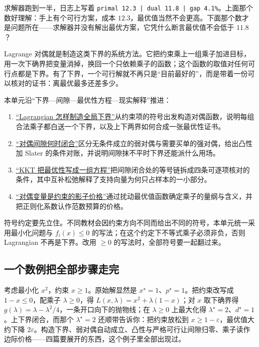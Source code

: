 求解器跑到一半，日志上写着 \texttt{primal 12.3 | dual 11.8 | gap 4.1\%}。上面那个数好理解：手上有个可行方案，成本 \(12.3\)，最优值当然不会更高。下面那个数才是问题所在——求解器并没有解出最优方案，它凭什么断言最优值不会低于 \(11.8\)？

Lagrange 对偶就是制造这类下界的系统方法。它把约束乘上一组乘子加进目标，用一次下确界把变量消掉，换回一个只依赖乘子的函数；这个函数的取值对任何可行点都是下界。有了下界，一个可行解就不再只是``目前最好的''，而是带着一份可以核对的证书：离最优最多还差多少。

本单元沿``下界---间隙---最优性方程---现实解释''推进：

\begin{enumerate}
\tightlist
\item
  \hyperref[sec:09-Convex-Optimization/05-Duality/01]{``Lagrangian 怎样制造全局下界''}从约束项的符号出发构造对偶函数，说明每组合法乘子都白送一个下界，以及上下两界如何合成一张最优性证书。
\item
  \hyperref[sec:09-Convex-Optimization/05-Duality/02]{``对偶间隙何时闭合''}区分无条件成立的弱对偶与需要买单的强对偶，给出凸性加 Slater 的条件对账，并说明间隙抹不平时下界还能派什么用场。
\item
  \hyperref[sec:09-Convex-Optimization/05-Duality/03]{``KKT 把最优性写成一组方程''}把间隙闭合处的等号链拆成四条可逐项核对的条件，其中互补松弛解释了支持向量为何只占样本的一小部分。
\item
  \hyperref[sec:09-Convex-Optimization/05-Duality/04]{``对偶变量是约束的影子价格''}通过扰动最优值函数确定乘子的量纲与含义，并把正则化系数认作范数预算的价格。
\end{enumerate}

符号约定要先立住。不同教材会因约束方向不同而给出不同的符号，本单元统一采用最小化问题与 \(f_i(x)\le0\) 的写法；在这个约定下不等式乘子必须非负，否则 Lagrangian 不再是下界。改用 \(\ge0\) 的写法时，全部符号要一起翻过来。

\subsection{一个数例把全部步骤走完}

考虑最小化 \(x^2\)，约束 \(x\ge1\)。原始解显然是 \(x^\star=1\)、\(p^\star=1\)。把约束改写成 \(1-x\le0\)，配乘子 \(\lambda\ge0\)，得 \(L(x,\lambda)=x^2+\lambda(1-x)\)；对 \(x\) 取下确界得 \(g(\lambda)=\lambda-\lambda^2/4\)，一条开口向下的抛物线；在 \(\lambda\ge0\) 上最大化得 \(\lambda^\star=2\)、\(d^\star=1\)。上下界闭合，而那个 \(\lambda^\star=2\) 还顺带告诉你：把约束放松到 \(x\ge1-\varepsilon\)，最优值大约下降 \(2\varepsilon\)。构造下界、弱对偶自动成立、凸性与严格可行让间隙归零、乘子读作边际价格——四篇要展开的东西，这个例子里全部出现过。

